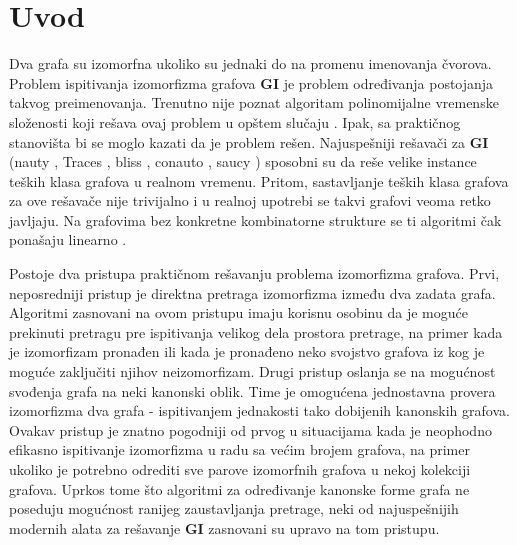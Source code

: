 \documentclass[12pt,oneside]{memoir}
\theoremstyle{definition}
\begin{document}
\frontmatter
\naslovna
\komisija
\apstrakt
\tableofcontents*

\mainmatter

\chapter{Uvod}

 Dva grafa su izomorfna ukoliko su jednaki do na promenu imenovanja čvorova.
 Problem ispitivanja izomorfizma grafova \textbf{GI} je problem određivanja
 postojanja takvog preimenovanja. Trenutno nije poznat algoritam polinomijalne
 vremenske složenosti koji rešava ovaj problem u opštem slučaju \cite{Babai}.
 Ipak, sa praktičnog stanovišta bi se moglo kazati da je problem rešen.
 Najuspešniji rešavači za \textbf{GI} (nauty \cite{McKay1,McKay}, Traces
 \cite{Piperno,McKay}, bliss \cite{Bliss}, conauto \cite{Conauto}, saucy
 \cite{Saucy}) sposobni su da reše velike instance teških klasa grafova u
 realnom vremenu. Pritom, sastavljanje teških klasa grafova za ove rešavače
 nije trivijalno i u realnoj upotrebi se takvi grafovi veoma retko javljaju. Na
 grafovima bez konkretne kombinatorne strukture se ti algoritmi čak ponašaju
 linearno \cite{Benchmark}.

 Postoje dva pristupa praktičnom rešavanju problema izomorfizma grafova. Prvi,
 neposredniji pristup je direktna pretraga izomorfizma između dva zadata grafa.
 Algoritmi zasnovani na ovom pristupu imaju korisnu osobinu da je moguće
 prekinuti pretragu pre ispitivanja velikog dela prostora pretrage, na primer
 kada je izomorfizam pronađen ili kada je pronađeno neko svojstvo grafova iz
 kog je moguće zaključiti njihov neizomorfizam. Drugi pristup oslanja se na
 mogućnost svođenja grafa na neki kanonski oblik. Time je omogućena jednostavna
 provera izomorfizma dva grafa - ispitivanjem jednakosti tako dobijenih
 kanonskih grafova. Ovakav pristup je znatno pogodniji od prvog u situacijama
 kada je neophodno efikasno ispitivanje izomorfizma u radu sa većim brojem
 grafova, na primer ukoliko je potrebno odrediti sve parove izomorfnih grafova
 u nekoj kolekciji grafova.  Uprkos tome što algoritmi za određivanje kanonske
 forme grafa ne poseduju mogućnost ranijeg zaustavljanja pretrage, neki od
 najuspešnijih modernih alata za rešavanje \textbf{GI} zasnovani su upravo na
 tom pristupu. 
\end{document}
